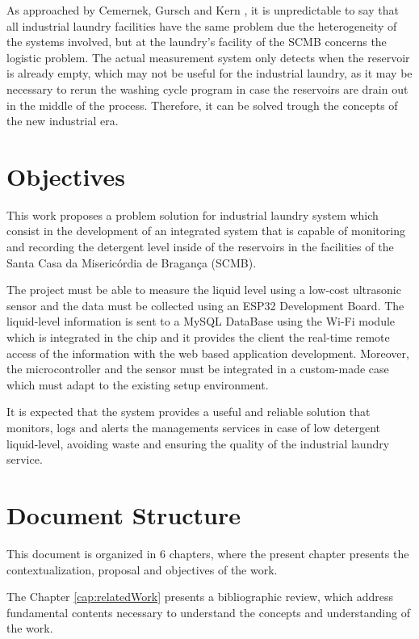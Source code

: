 As approached by Cemernek, Gursch and Kern \cite[p. 240]{CEMERNEK:2017}, it is unpredictable to say that all industrial laundry facilities have the same problem due the heterogeneity of the systems involved, but at the laundry's facility of the \gls{SCMB} concerns the logistic problem. The actual measurement system only detects when the reservoir is already empty, which may not be useful for the industrial laundry, as it may be necessary to rerun the washing cycle program in case the reservoirs are drain out in the middle of the process. Therefore, it can be solved trough the concepts of the new industrial era.


\section{Objectives}\label{cap:intro:objectives}



This work proposes a problem solution for industrial laundry system which consist in the development of an integrated system that is capable of monitoring and recording the detergent level inside of the reservoirs in the facilities of the Santa Casa da Misericórdia de Bragança (SCMB).

The project must be able to measure the liquid level using a low-cost ultrasonic sensor and the data must be collected using an ESP32 Development Board. The liquid-level information is sent to a MySQL DataBase using the Wi-Fi module which is integrated in the chip and it provides the client the real-time remote access of the information with the web based application development. Moreover, the microcontroller and the sensor must be integrated in a custom-made case which must adapt to the existing setup environment.

It is expected that the system provides a useful and reliable solution that monitors, logs and alerts the managements services in case of low detergent liquid-level, avoiding waste and ensuring the quality of the industrial laundry service.


\section{Document Structure}\label{cap:intro:document-sctruture}

This document is organized in 6 chapters, where the present chapter presents the contextualization, proposal and objectives of the work.

The Chapter \ref{cap:relatedWork} presents a bibliographic review, which address fundamental contents necessary to understand the concepts and understanding of the work.

